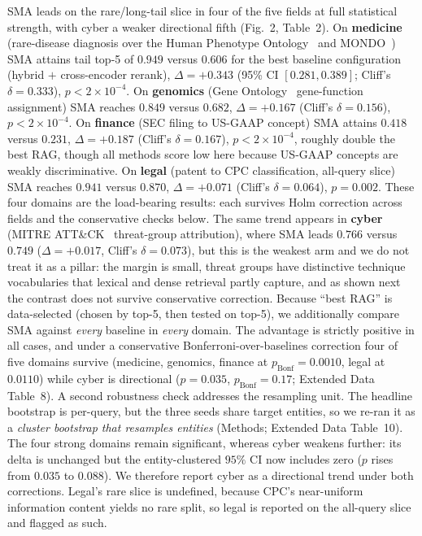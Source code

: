 \documentclass[pdflatex,sn-nature]{sn-jnl}
\begin{document}
SMA leads on the rare/long-tail slice in four of the five fields at full
statistical strength, with cyber a weaker directional fifth (Fig.~2,
Table~2). On \textbf{medicine} (rare-disease diagnosis over the Human
Phenotype Ontology~\cite{kohler2021hpo} and MONDO~\cite{vasilevsky2022mondo}) SMA
attains tail top-5 of $0.949$ versus $0.606$ for the best baseline
configuration (hybrid $+$ cross-encoder rerank), $\Delta{=}{+}0.343$ (95\% CI
$[0.281,0.389]$; Cliff's $\delta{=}0.333$), $p{<}2{\times}10^{-4}$. On \textbf{genomics} (Gene
Ontology~\cite{ashburner2000go,geneontology2021} gene-function assignment) SMA
reaches $0.849$ versus $0.682$, $\Delta{=}{+}0.167$ (Cliff's $\delta{=}0.156$), $p{<}2{\times}10^{-4}$. On
\textbf{finance} (SEC filing to US-GAAP concept) SMA attains $0.418$ versus
$0.231$, $\Delta{=}{+}0.187$ (Cliff's $\delta{=}0.167$), $p{<}2{\times}10^{-4}$, roughly double the best
RAG, though all methods score low here because US-GAAP concepts are weakly
discriminative. On \textbf{legal} (patent to CPC classification, all-query slice)
SMA reaches $0.941$ versus $0.870$, $\Delta{=}{+}0.071$ (Cliff's $\delta{=}0.064$), $p{=}0.002$. These four
domains are the load-bearing results: each survives Holm correction across fields
and the conservative checks below. The same trend appears in \textbf{cyber}
(MITRE ATT\&CK~\cite{strom2018attack} threat-group attribution), where SMA leads
$0.766$ versus $0.749$ ($\Delta{=}{+}0.017$, Cliff's $\delta{=}0.073$), but this is the weakest arm and we do
not treat it as a pillar: the margin is small, threat groups have distinctive
technique vocabularies that lexical and dense retrieval partly capture, and as
shown next the contrast does not survive conservative correction. Because ``best
RAG'' is data-selected (chosen by top-5, then tested on top-5), we additionally
compare SMA against \emph{every} baseline in \emph{every} domain. The advantage is
strictly positive in all cases, and under a conservative
Bonferroni-over-baselines correction four of five domains survive (medicine,
genomics, finance at $p_\text{Bonf}{=}0.0010$, legal at $0.0110$) while cyber is
directional ($p{=}0.035$, $p_\text{Bonf}{=}0.17$; Extended Data Table~8). A second
robustness check addresses the resampling unit. The headline bootstrap is
per-query, but the three seeds share target entities, so we re-ran it as a
\emph{cluster bootstrap that resamples entities} (Methods; Extended Data
Table~10). The four strong domains remain significant, whereas cyber weakens
further: its delta is unchanged but the entity-clustered $95\%$ CI now includes
zero ($p$ rises from $0.035$ to $0.088$). We therefore report cyber as a
directional trend under both corrections. Legal's rare slice is undefined, because
CPC's near-uniform information content yields no rare split, so legal is reported on
the all-query slice and flagged as such.
\end{document}
